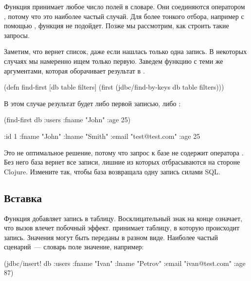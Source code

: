 Функция принимает любое число полей в словаре. Они соединяются оператором , потому что это наиболее частый случай. Для более тонкого отбора, например с помощью , функция не подойдет. Позже мы рассмотрим, как строить такие запросы.

Заметим, что  вернет список, даже если нашлась только одна запись. В некоторых случаях мы намеренно ищем только первую. Заведем функцию  с теми же аргументами, которая оборачивает результат в .

\begin{english}
  \begin{clojure}
(defn find-first [db table filters]
  (first (jdbc/find-by-keys db table filters)))
  \end{clojure}
\end{english}

В этом случае результат будет либо первой записью, либо :

\begin{english}
  \begin{clojure}
(find-first db :users {:fname "John" :age 25})

{:id 1 :fname "John" :lname "Smith"
 :email "test@test.com" :age 25}
  \end{clojure}
\end{english}

Это не оптимальное решение, потому что запрос к базе не содержит оператора . Без него база вернет все записи, лишние из которых отбрасываются на стороне Clojure. Измените  так, чтобы база возвращала одну запись силами SQL.

\subsection{Вставка}

Функция  добавляет запись в таблицу. Восклицательный знак на конце означает, что вызов влечет побочный эффект.  принимает таблицу, в которую происходит запись. Значения могут быть переданы в разном виде. Наиболее частый сценарий~--- словарь поле \arr значение, например:

\begin{english}
  \begin{clojure}
(jdbc/insert! db :users
              {:fname "Ivan"
               :lname "Petrov"
               :email "ivan@test.com"
               :age 87})
  \end{clojure}
\end{english}

